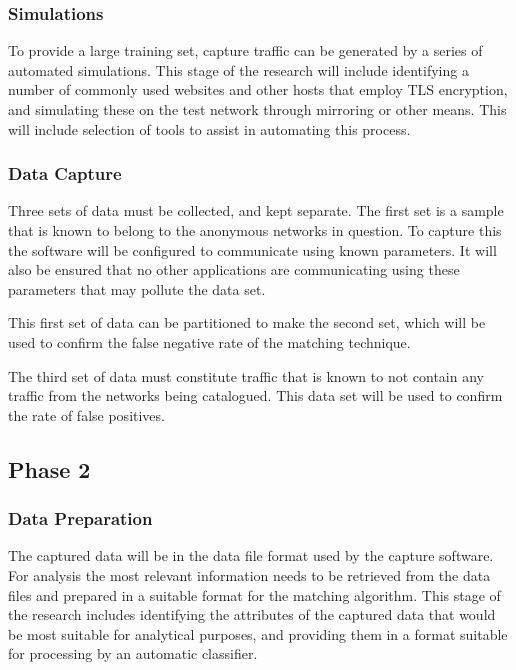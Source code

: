 \documentclass{ecuthesis}
\begin{document}
\subsubsection{Simulations}

To provide a large training set, capture traffic can be generated by a series
of automated simulations. This stage of the research will include identifying a
number of commonly used websites and other hosts that employ TLS encryption,
and simulating these on the test network through mirroring or other means. This
will include selection of tools to assist in automating this process.

\subsubsection{Data Capture}

Three sets of data must be collected, and kept separate. The first set is a
sample that is known to belong to the anonymous networks in question. To
capture this the software will be configured to communicate using known
parameters. It will also be ensured that no other applications are
communicating using these parameters that may pollute the data set.

This first set of data can be partitioned to make the second set, which will be
used to confirm the false negative rate of the matching technique.

The third set of data must constitute traffic that is known to not contain any
traffic from the networks being catalogued. This data set will be used to
confirm the rate of false positives.

\subsection{Phase 2}

\subsubsection{Data Preparation}

The captured data will be in the data file format used by the capture software.
For analysis the most relevant information needs to be retrieved from the data
files and prepared in a suitable format for the matching algorithm. This stage
of the research includes identifying the attributes of the captured data that
would be most suitable for analytical purposes, and providing them in a format
suitable for processing by an automatic classifier.
\end{document}
